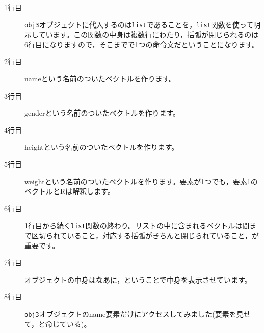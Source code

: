 \begin{description}
	\item[1行目] \texttt{obj3}オブジェクトに代入するのは\texttt{list}であることを，\texttt{list}関数を使って明示しています。この関数の中身は複数行にわたり，括弧が閉じられるのは6行目になりますので，そこまでで1つの命令文だということになります。
	\item[2行目] nameという名前のついたベクトルを作ります。
	\item[3行目] genderという名前のついたベクトルを作ります。
	\item[4行目] heightという名前のついたベクトルを作ります。
	\item[5行目] weightという名前のついたベクトルを作ります。要素が1つでも，要素1のベクトルとRは解釈します。
	\item[6行目] 1行目から続く\texttt{list}関数の終わり。リストの中に含まれるベクトルは間まで区切られていること，対応する括弧がきちんと閉じられていること，が重要です。
	\item[7行目] オブジェクトの中身はなあに，ということで中身を表示させています。
	\item[8行目] \texttt{obj3}オブジェクトのname要素だけにアクセスしてみました(要素を見せて，と命じている)。
\end{description}
